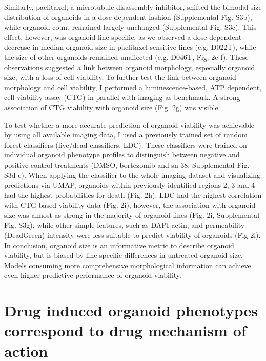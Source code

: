 \begin{flushleft}
\bigbreak

Similarly, paclitaxel, a microtubule disassembly inhibitor, shifted the bimodal size distribution of organoids in a dose-dependent fashion (Supplemental Fig. S3b), while organoid count remained largely unchanged (Supplemental Fig. S3c). This effect, however, was organoid line-specific, as we observed a dose-dependent decrease in median organoid size in paclitaxel sensitive lines (e.g. D022T), while the size of other organoids remained unaffected (e.g. D046T, Fig. 2c-f). These observations suggested a link between organoid morphology, especially organoid size, with a loss of cell viability. To further test the link between organoid morphology and cell viability, I performed a luminescence-based, ATP dependent, cell viability assay (CTG) in parallel with imaging as benchmark. A strong association of CTG viability with organoid size (Fig. 2g) was visible. 

\bigbreak

To test whether a more accurate prediction of organoid viability was achievable by using all available imaging data, I used a previously trained set of random forest classifiers (live/dead classifiers, LDC). These classifiers were trained on individual organoid phenotype profiles to distinguish between negative and positive control treatments (DMSO, bortezomib and sn-38, Supplemental Fig. S3d-e). When applying the classifier to the whole imaging dataset and visualizing predictions via UMAP, organoids within previously identified regions 2, 3 and 4 had the highest probabilities for death (Fig. 2h). LDC had the highest correlation with CTG based viability data (Fig. 2i), however, the association with organoid size was almost as strong in the majority of organoid lines (Fig. 2i, Supplemental Fig. S3g), while other simple features, such as DAPI actin, and permeability (DeadGreen) intensity were less suitable to predict viability of organoids (Fig 2i). In conclusion, organoid size is an informative metric to describe organoid viability, but is biased by line-specific differences in untreated organoid size. Models consuming more comprehensive morphological information can achieve even higher predictive performance of organoid viability. 

\section{Drug induced organoid phenotypes correspond to drug mechanism of action}


\end{flushleft}
